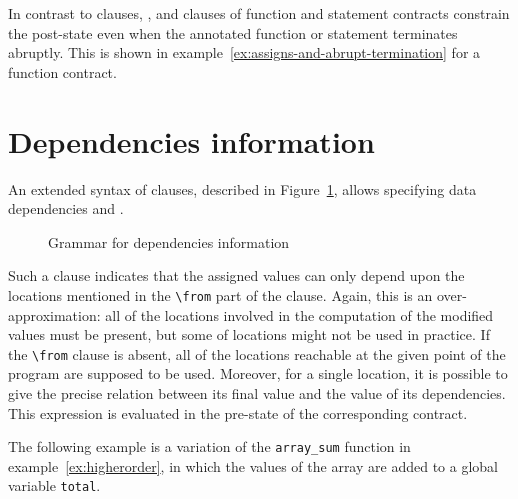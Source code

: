 In contrast to \ensures clauses, \assigns{}, 
\allocates{} and \frees{} clauses of function 
and statement contracts constrain the post-state 
even when the annotated function or statement terminates abruptly. 
This is shown in example~\ref{ex:assigns-and-abrupt-termination} for a function contract.




\section{Dependencies information}
\label{sec:func-dep}

\experimental

An extended syntax of \assigns clauses, described in
Figure~\ref{fig:gram:dep}, allows specifying data
dependencies and
.

\begin{figure}[t]
  \begin{cadre}
      
    \end{cadre}
  \caption{Grammar for dependencies information}
\label{fig:gram:dep}
\end{figure}

Such a clause indicates that the assigned values can only depend upon
the locations mentioned in the \lstinline|\from| part of the
clause. Again, this is an over-approximation: all of the locations
involved in the computation of the modified values must be present,
but some of locations might not be used in practice. If the
\lstinline|\from| clause is absent, all of the locations reachable at the
given point of the program are supposed to be used.
Moreover, for a single location, it is possible to give the precise
relation between its final value and the value of its
dependencies. This expression is evaluated in the pre-state of the
corresponding contract.

\begin{example}
  The following example is a variation of the \lstinline+array_sum+
  function in example~\ref{ex:higherorder}, in which the values of
  the array are added to a global variable \lstinline+total+.


\end{example}


